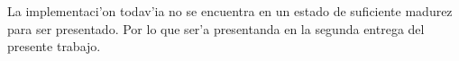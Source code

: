 La implementaci'on todav'ia no se encuentra en un estado de suficiente madurez para ser presentado. Por lo que ser'a presentanda en la segunda entrega del presente trabajo.
